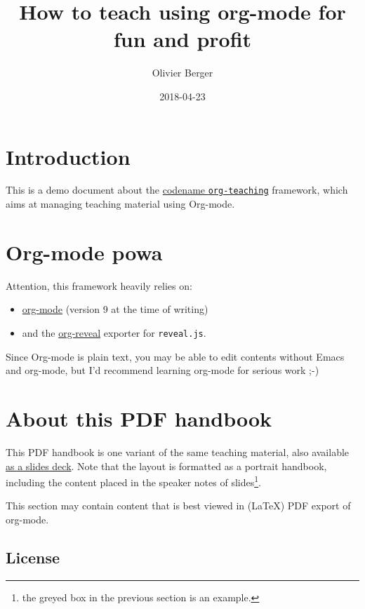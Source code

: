 \documentclass[a4paper]{article}
\author{Olivier Berger}
\date{2018-04-23}
\title{How to teach using org-mode for fun and profit}
\begin{document}
\setcounter{tocdepth}{1}
\tableofcontents


\section{Introduction}
\label{sec:orgfe3687f}

This is a demo document about the
\href{http://www-public.tem-tsp.eu/\~berger\_o/org-teaching/}{codename \texttt{org-teaching}} 
framework, which aims at managing teaching material using Org-mode.

\section{Org-mode powa}
\label{sec:org0860194}

Attention, this framework heavily relies on: 

\begin{itemize}
\item \href{http://orgmode.org/}{org-mode} (version 9 at the time of writing)
\item and the \href{https://github.com/yjwen/org-reveal/}{org-reveal} exporter for \texttt{reveal.js}.
\end{itemize}

\begin{NOTES}
Since Org-mode is plain text, you may be able to edit contents without
Emacs and org-mode, but I'd recommend learning org-mode for serious
work ;-)
\end{NOTES}

\section{About this PDF handbook}
\label{sec:org080ff04}

This PDF handbook is one variant of the same teaching material, also
available \href{./slides.html}{as a slides deck}. Note that the layout is
formatted as a portrait handbook, including the content placed in the
speaker notes of slides\footnote{the greyed box in the previous section is an example.}.

This section may contain content that is best viewed in (\LaTeX{}) PDF export of org-mode.

\subsection{License}
\label{sec:org57506ea}
\end{document}
